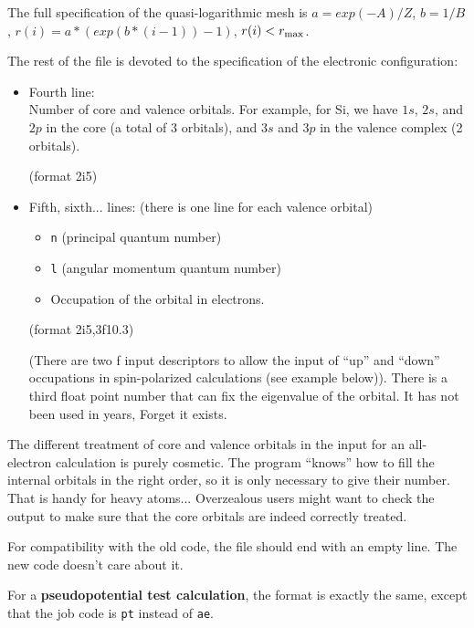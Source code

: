 \documentclass[11pt]{article}
\begin{document}
\begin{itemize}
The full specification of the quasi-logarithmic mesh is
$a = exp(-A)/Z$, $b = 1/B$, $r(i) = a*(exp(b*(i-1))-1)$, $r(i) < r_{\rm max}$.

\end{itemize}

The rest of the file is devoted to the specification of the electronic
configuration:

\begin{itemize}

\item Fourth line:\\
	 Number of core and valence orbitals. For example, for Si, we
	have $1s$, $2s$, and $2p$ in the core (a total of 3 orbitals), and
	$3s$ and $3p$ in the valence complex (2 orbitals).

	(format 2i5)

\item Fifth, sixth... lines: (there is one line for each valence
orbital)
	\begin{itemize}
	\item {\tt n} (principal quantum number)
	\item {\tt l} (angular momentum quantum number)
	\item Occupation of the orbital in electrons.
	\end{itemize}

	(format 2i5,3f10.3)

	(There are two f input descriptors to allow the input of ``up''
	and ``down'' occupations in spin-polarized calculations (see
	example below)).
	There is a third float point number that can fix the eigenvalue of the orbital.
	It has not been used in years,  Forget it exists.

\end{itemize}


The different treatment of core and valence orbitals in the input for an
all-electron calculation is purely cosmetic. The program ``knows'' how
to fill the internal orbitals in the right order, so it is only
necessary to give their number. That is handy for heavy atoms...
Overzealous users might want to check the output to make sure that the
core orbitals are indeed correctly treated.

For compatibility with the old code, the file should end
with an empty line.  The new code doesn't care about it.

For a {\bf pseudopotential test calculation}, the format is exactly
the same, except that the job code is {\tt pt} instead of {\tt ae}.
\end{document}
